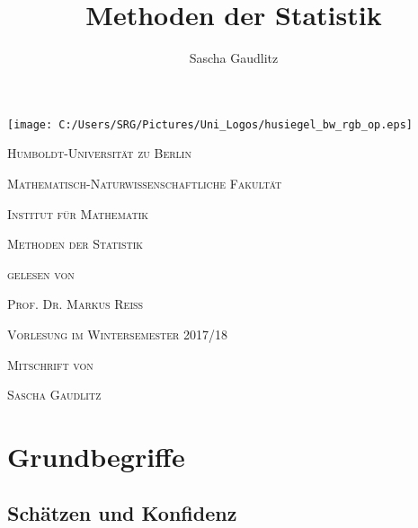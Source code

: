 \documentclass[a4paper]{scrartcl}
\title{Methoden der Statistik}
\author{Sascha Gaudlitz}
\begin{document}
\begin{titlepage}
\begin{center}
{\texttt{[image: C:/Users/SRG/Pictures/Uni\_Logos/husiegel\_bw\_rgb\_op.eps]}\par}
	\vspace{1cm}
	{\scshape \Large Humboldt-Universität zu Berlin\par}
	{\scshape Mathematisch-Naturwissenschaftliche Fakultät\par}
	{\scshape Institut für Mathematik\par}
	\vspace{1cm}
	{\scshape \Huge Methoden der Statistik\par}
	\vspace{1cm}
	{\scshape \Large gelesen von\par}
	\vspace{1cm}
	{\scshape \Huge Prof. Dr. Markus Reiß\par}
	\vspace{1cm}
	{\scshape \Large Vorlesung im Wintersemester 2017/18\par}
	\vspace{2cm}
	{\scshape \Large Mitschrift von\par}
	\vspace{1cm}
	{\scshape \LARGE Sascha Gaudlitz\par}
\end{center}
\end{titlepage}
\thispagestyle{empty}
\newpage
\thispagestyle{empty}
\tableofcontents
\newpage


\section{Grundbegriffe}

	\subsection{Schätzen und Konfidenz}
	
\end{document}
